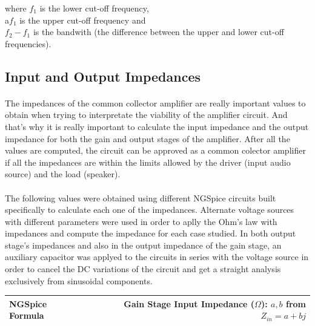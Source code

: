 where $f_1$ is the lower cut-off frequency,\\
a$f_1$ is the upper cut-off frequency and\\
$f_2-f_1$ is the bandwith (the difference between the upper and lower cut-off frequencies).


\subsection{Input and Output Impedances}

\paragraph{}
The impedances of the common collector amplifier are really important values to obtain when trying to interpretate the viability of the amplifier circuit. And that's why it is really important to calculate the input impedance and the output impedance for both the gain and output stages of the amplifier. After all the values are computed, the circuit can be approved as a common colector amplifier if all the impedances are within the limits allowed by the driver (input audio source) and the load (speaker).

\paragraph{}
The following values were obtained using different NGSpice circuits built specifically to calculate each one of the impedances. Alternate voltage sources with different parameters were used in order to aplly the Ohm's law with impedances and compute the impedance for each case studied. In both output stage's impedances and also in the output impedance of the gain stage, an auxiliary capacitor was applyed to the circuits  in series with the voltage source in order to cancel the DC variations of the circuit and get a straight analysis exclusively from sinusoidal components.

\begin{table}[H] \centering
  \begin{tabular}{|l|r|}
    \hline    
    {\bf NGSpice Formula} & {\bf Gain Stage Input Impedance ($\Omega$): $a,b$ from $Z_{in}=a+bj$}\\ \hline
    
  \end{tabular}
 \label{tab:inputimp}
\end{table}

